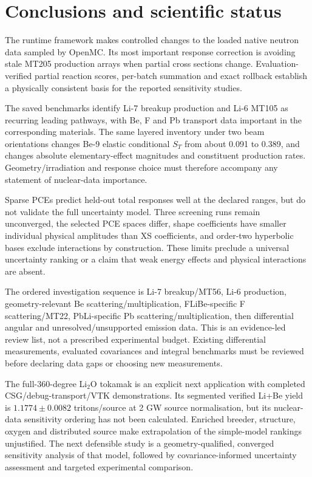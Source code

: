 \section{Conclusions and scientific status}
The runtime framework makes controlled changes to the loaded native neutron data sampled by OpenMC. Its most important response correction is avoiding stale MT205 production arrays when partial cross sections change. Evaluation-verified partial reaction scores, per-batch summation and exact rollback establish a physically consistent basis for the reported sensitivity studies.

The saved benchmarks identify Li-7 breakup production and Li-6 MT105 as recurring leading pathways, with Be, F and Pb transport data important in the corresponding materials. The same layered inventory under two beam orientations changes Be-9 elastic conditional $S_T$ from about 0.091 to 0.389, and changes absolute elementary-effect magnitudes and constituent production rates. Geometry/irradiation and response choice must therefore accompany any statement of nuclear-data importance.

Sparse PCEs predict held-out total responses well at the declared ranges, but do not validate the full uncertainty model. Three screening runs remain unconverged, the selected PCE spaces differ, shape coefficients have smaller individual physical amplitudes than XS coefficients, and order-two hyperbolic bases exclude interactions by construction. These limits preclude a universal uncertainty ranking or a claim that weak energy effects and physical interactions are absent.

The ordered investigation sequence is Li-7 breakup/MT56, Li-6 production, geometry-relevant Be scattering/multiplication, FLiBe-specific F scattering/MT22, PbLi-specific Pb scattering/multiplication, then differential angular and unresolved/unsupported emission data. This is an evidence-led review list, not a prescribed experimental budget. Existing differential measurements, evaluated covariances and integral benchmarks must be reviewed before declaring data gaps or choosing new measurements.

The full-360-degree Li$_2$O tokamak is an explicit next application with completed CSG/debug-transport/VTK demonstrations. Its segmented verified Li+Be yield is $1.1774\pm0.0082$ tritons/source at 2 GW source normalisation, but its nuclear-data sensitivity ordering has not been calculated. Enriched breeder, structure, oxygen and distributed source make extrapolation of the simple-model rankings unjustified. The next defensible study is a geometry-qualified, converged sensitivity analysis of that model, followed by covariance-informed uncertainty assessment and targeted experimental comparison.

